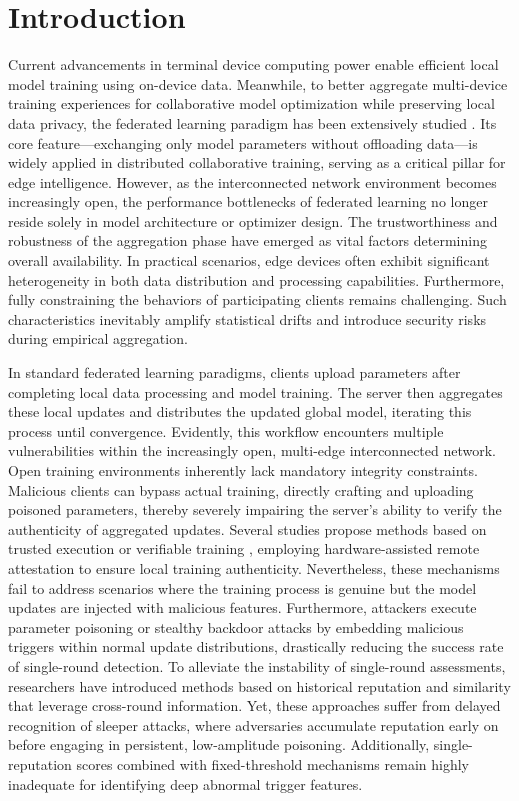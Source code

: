 \documentclass[final,5p,times,twocolumn]{elsarticle/elsarticle}
\begin{document}
\section{Introduction}

Current advancements in terminal device computing power enable efficient local model training using on-device data. Meanwhile, to better aggregate multi-device training experiences for collaborative model optimization while preserving local data privacy, the federated learning paradigm has been extensively studied \cite{kairouz2021flsurvey}. Its core feature---exchanging only model parameters without offloading data---is widely applied in distributed collaborative training, serving as a critical pillar for edge intelligence. However, as the interconnected network environment becomes increasingly open, the performance bottlenecks of federated learning no longer reside solely in model architecture or optimizer design. The trustworthiness and robustness of the aggregation phase have emerged as vital factors determining overall availability. In practical scenarios, edge devices often exhibit significant heterogeneity in both data distribution and processing capabilities. Furthermore, fully constraining the behaviors of participating clients remains challenging. Such characteristics inevitably amplify statistical drifts and introduce security risks during empirical aggregation.

In standard federated learning paradigms, clients upload parameters after completing local data processing and model training. The server then aggregates these local updates and distributes the updated global model, iterating this process until convergence. Evidently, this workflow encounters multiple vulnerabilities within the increasingly open, multi-edge interconnected network. Open training environments inherently lack mandatory integrity constraints. Malicious clients can bypass actual training, directly crafting and uploading poisoned parameters, thereby severely impairing the server's ability to verify the authenticity of aggregated updates. Several studies propose methods based on trusted execution or verifiable training \cite{lu2025tmt,zhang2025rppfl,r1_tee_integrity}, employing hardware-assisted remote attestation to ensure local training authenticity. Nevertheless, these mechanisms fail to address scenarios where the training process is genuine but the model updates are injected with malicious features. Furthermore, attackers execute parameter poisoning or stealthy backdoor attacks \cite{bagdasaryan2020backdoor,wang2019neuralcleanse} by embedding malicious triggers within normal update distributions, drastically reducing the success rate of single-round detection. To alleviate the instability of single-round assessments, researchers have introduced methods based on historical reputation and similarity \cite{cao2021fltrust,fung2020foolsgold} that leverage cross-round information. Yet, these approaches suffer from delayed recognition of sleeper attacks, where adversaries accumulate reputation early on before engaging in persistent, low-amplitude poisoning. Additionally, single-reputation scores combined with fixed-threshold mechanisms remain highly inadequate for identifying deep abnormal trigger features.
\end{document}
